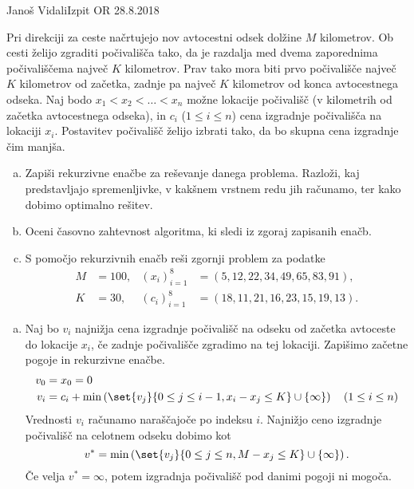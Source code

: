 \begin{naloga}{Janoš Vidali}{Izpit OR 28.8.2018}
\begin{vprasanje}
Pri direkciji za ceste načrtujejo nov avtocestni odsek dolžine $M$ kilometrov.
Ob cesti želijo zgraditi počivališča tako,
da je razdalja med dvema zaporednima počivališčema največ $K$ kilometrov.
Prav tako mora biti prvo počivališče največ $K$ kilometrov od začetka,
zadnje pa največ $K$ kilometrov od konca avtocestnega odseka.
Naj bodo $x_1 < x_2 < \dots < x_n$ možne lokacije počivališč
(v kilometrih od začetka avtocestnega odseka),
in $c_i$ ($1 \le i \le n$) cena izgradnje počivališča na lokaciji $x_i$.
Postavitev počivališč želijo izbrati tako,
da bo skupna cena izgradnje čim manjša.

\begin{enumerate}[(a)]
\item Zapiši rekurzivne enačbe za reševanje danega problema.
Razloži, kaj pred\-stav\-lja\-jo spremenljivke,
v kakšnem vrstnem redu jih računamo, ter kako dobimo optimalno rešitev.

\item Oceni časovno zahtevnost algoritma, ki sledi iz zgoraj zapisanih enačb.

\item S pomočjo rekurzivnih enačb reši zgornji problem za podatke
\begin{align*}
M &= 100, & (x_i)_{i=1}^8 &= ( 5, 12, 22, 34, 49, 65, 83, 91), \\
K &= 30,  & (c_i)_{i=1}^8 &= (18, 11, 21, 16, 23, 15, 19, 13).
\end{align*}
\end{enumerate}
\end{vprasanje}

\begin{odgovor}
\begin{enumerate}[(a)]
\item Naj bo $v_i$ najnižja cena izgradnje počivališč
na odseku od začetka avtoceste do lokacije $x_i$,
če zadnje počivališče zgradimo na tej lokaciji.
Zapišimo začetne pogoje in rekurzivne enačbe.
\begin{align*}
v_0 &= x_0 = 0 \\
v_i &= c_i + \min\left(\set{v_j}{0 \le j \le i-1, x_i - x_j \le K}
                       \cup \{\infty\}\right)
\quad (1 \le i \le n)
\end{align*}
Vrednosti $v_i$ računamo naraščajoče po indeksu $i$.
Najnižjo ceno izgradnje počivališč na celotnem odseku dobimo kot
$$
v^* = \min\left(\set{v_j}{0 \le j \le n, M - x_j \le K} \cup \{\infty\}\right) .
$$
Če velja $v^* = \infty$, potem izgradnja počivališč pod danimi pogoji ni mogoča.


\end{enumerate}
\end{odgovor}
\end{naloga}
